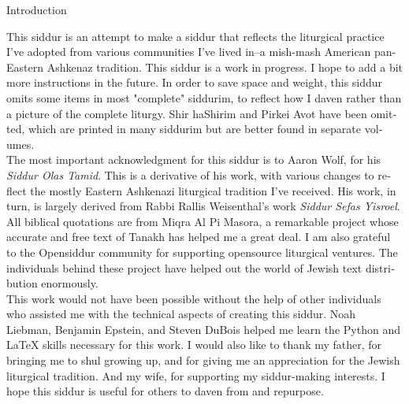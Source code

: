 \documentclass[twoside, openany, parskip=half, 11pt]{book}
\begin{document}
\begin{minipage}{\textwidth}
	
	\begin{english}
		\begin{center} %
			\begin{LARGE}
				Introduction
			\end{LARGE}
		\end{center}
		
		This siddur is an attempt to make a siddur that reflects the liturgical practice I've adopted from various communities I've lived in--a mish-mash American pan-Eastern Ashkenaz tradition. This siddur is a work in progress.  I hope to add a bit more instructions in the future. In order to save space and weight, this siddur omits some items in most "complete" siddurim, to reflect how I daven rather than a picture of the complete liturgy.  Shir haShirim and Pirkei Avot have been omitted, which are printed in many siddurim but are better found in separate volumes.\\
		
		The most important acknowledgment for this siddur is to Aaron Wolf, for his \textit{Siddur Olas Tamid}.  This is a derivative of his work, with various changes to reflect the mostly Eastern Ashkenazi liturgical tradition I've received.  His work, in turn, is largely derived from Rabbi Rallis Weisenthal's work \textit{Siddur Sefas Yisroel}.  All biblical quotations are from Miqra Al Pi Masora, a remarkable project whose accurate and free text of Tanakh has helped me a great deal.  I am also grateful to the Opensiddur community for supporting opensource liturgical ventures.  The individuals behind these project have helped out the world of Jewish text distribution enormously.\\
		
		This work would not have been possible without the help of other individuals who assisted me with the technical aspects of creating this siddur.  Noah Liebman, Benjamin Epstein, and Steven DuBois helped me learn the Python and \LaTeX{} skills necessary for this work. I would also like to thank my father, for bringing me to shul growing up, and for giving me an appreciation for the Jewish liturgical tradition.  And my wife, for supporting my siddur-making interests. I hope this siddur is useful for others to daven from and repurpose.
		
	\end{english}
	
\end{minipage}
\end{document}
